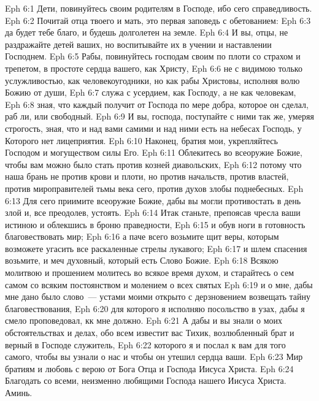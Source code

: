 \vs Eph 6:1 Дети, повинуйтесь своим родителям в Господе, ибо сего  справедливость.
\vs Eph 6:2 Почитай отца твоего и мать, это первая заповедь с обетованием:
\vs Eph 6:3 да будет тебе благо, и будешь долголетен на земле.
\vs Eph 6:4 И вы, отцы, не раздражайте детей ваших, но воспитывайте их в учении и наставлении Господнем.
\rsbpar\vs Eph 6:5 Рабы, повинуйтесь господам своим по плоти со страхом и трепетом, в простоте сердца вашего, как Христу,
\vs Eph 6:6 не с видимою только услужливостью, как человекоугодники, но как рабы Христовы, исполняя волю Божию от души,
\vs Eph 6:7 служа с усердием, как Господу, а не как человекам,
\vs Eph 6:8 зная, что каждый получит от Господа по мере добра, которое он сделал, раб ли, или свободный.
\vs Eph 6:9 И вы, господа, поступайте с ними так же, умеряя строгость, зная, что и над вами самими и над ними есть на небесах Господь, у Которого нет лицеприятия.
\rsbpar\vs Eph 6:10 Наконец, братия мои, укрепляйтесь Господом и могуществом силы Его.
\vs Eph 6:11 Облекитесь во всеоружие Божие, чтобы вам можно было стать против козней диавольских,
\vs Eph 6:12 потому что наша брань не против крови и плоти, но против начальств, против властей, против мироправителей тьмы века сего, против духов злобы поднебесных.
\vs Eph 6:13 Для сего приимите всеоружие Божие, дабы вы могли противостать в день злой и, все преодолев, устоять.
\vs Eph 6:14 Итак станьте, препоясав чресла ваши истиною и облекшись в броню праведности,
\vs Eph 6:15 и обув ноги в готовность благовествовать мир;
\vs Eph 6:16 а паче всего возьмите щит веры, которым возможете угасить все раскаленные стрелы лукавого;
\vs Eph 6:17 и шлем спасения возьмите, и меч духовный, который есть Слово Божие.
\vs Eph 6:18 Всякою молитвою и прошением молитесь во всякое время духом, и старайтесь о сем самом со всяким постоянством и молением о всех святых
\vs Eph 6:19 и о мне, дабы мне дано было слово~--- устами моими открыто с дерзновением возвещать тайну благовествования,
\vs Eph 6:20 для которого я исполняю посольство в узах, дабы я смело проповедовал, кк мне должно.
\rsbpar\vs Eph 6:21 А дабы и вы знали о моих обстоятельствах и делах, обо всем известит вас Тихик, возлюбленный брат и верный в Господе служитель,
\vs Eph 6:22 которого я и послал к вам для того самого, чтобы вы узнали о нас и чтобы он утешил сердца ваши.
\rsbpar\vs Eph 6:23 Мир братиям и любовь с верою от Бога Отца и Господа Иисуса Христа.
\vs Eph 6:24 Благодать со всеми, неизменно любящими Господа нашего Иисуса Христа. Аминь.
